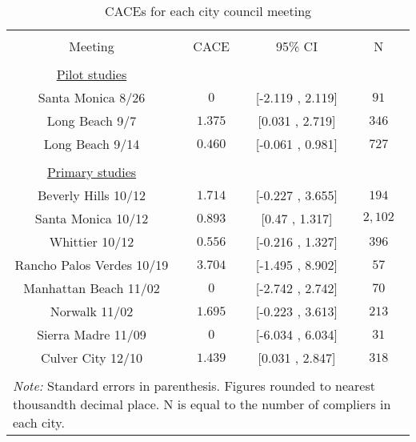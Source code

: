 
\begin{table}[!htbp] \centering 
  \caption{CACEs for each city council meeting} 
  \label{city_cace} 
\begin{tabular}{@{\extracolsep{30pt}} cccc} 
\\[-1.8ex]\hline 
\hline \\[-1.8ex] 
Meeting & CACE & 95\% CI & N \\ 
\hline \\[-1.8ex] 
\underline{Pilot studies} & & & \\
Santa Monica 8/26 & $0$ & [-2.119 , 2.119] & $91$ \\ 
Long Beach 9/7 & $1.375$ & [0.031 , 2.719] & $346$ \\ 
Long Beach 9/14 & $0.460$ & [-0.061 , 0.981] & $727$ \\ \\
\underline{Primary studies} & & & \\
Beverly Hills 10/12 & $1.714$ & [-0.227 , 3.655] & $194$ \\ 
Santa Monica 10/12 & $0.893$ & [0.47 , 1.317] & $2,102$ \\ 
Whittier 10/12 & $0.556$ & [-0.216 , 1.327] & $396$ \\ 
Rancho Palos Verdes 10/19 & $3.704$ & [-1.495 , 8.902] & $57$ \\ 
Manhattan Beach 11/02 & $0$ & [-2.742 , 2.742] & $70$ \\ 
Norwalk 11/02 & $1.695$ & [-0.223 , 3.613] & $213$ \\ 
Sierra Madre 11/09 & $0$ & [-6.034 , 6.034] & $31$ \\ 
Culver City 12/10 & $1.439$ & [0.031 , 2.847] & $318$ \\ 
\hline \\[-1.8ex] 
\multicolumn{4}{l}{\parbox[t]{\textwidth}{\footnotesize \textit{Note:} Standard errors in parenthesis. Figures rounded to nearest thousandth decimal place. N is equal to the number of compliers in each city.}} \\ 
\end{tabular} 
\end{table} 
